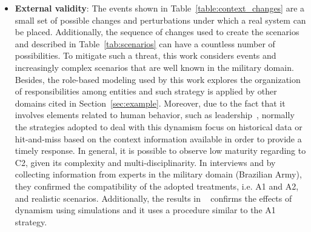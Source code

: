 \begin{itemize}
   
   \item \textbf{External validity}: The events shown in Table~\ref{table:context_changes} are a small set of possible changes and perturbations under which a real system can be placed. Additionally, the sequence of changes used to create the scenarios and described in Table~\ref{tab:scenarios} can have a countless number of possibilities. To mitigate such a threat, this work considers events and increasingly complex scenarios that are well known in the military domain.  Besides, the role-based modeling used by this work explores the organization of responsibilities among entities and such strategy is applied by other domains cited in Section~\ref{sec:example}. Moreover, due to the fact that it involves elements related to human behavior, such as leadership~\citep{Alberts2006}, normally the strategies adopted to deal with this dynamism focus on historical data or hit-and-miss based on the context information available in order to provide a timely response. In general, it is possible to observe low maturity regarding to C2, given its complexity and multi-disciplinarity. In interviews and by collecting information from experts in the military domain (Brazilian Army), they confirmed the compatibility of the adopted treatments, i.e. A1 and A2, and realistic scenarios. Additionally, the results in ~\citet{UAV01} confirms the effects of dynamism using simulations and it uses a procedure similar to the A1 strategy. 
   
\end{itemize}


